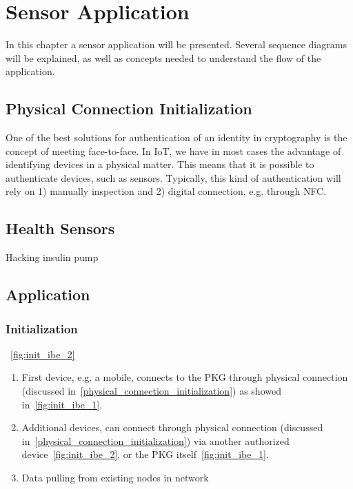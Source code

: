 \chapter{Sensor Application}
In this chapter a sensor application will be presented. 
Several sequence diagrams will be explained, as well as concepts needed to understand the flow of the application. 

\section{Physical Connection Initialization}\label{physical_connection_initialization}
One of the best solutions for authentication of an identity in cryptography is the concept of meeting face-to-face. 
In \gls{IoT}, we have in most cases the advantage of identifying devices in a physical matter. 
This means that it is possible to authenticate devices, such as sensors. 
Typically, this kind of authentication will rely on 1) manually inspection and 2) digital connection, e.g. through \gls{NFC}.

\section{Health Sensors}
Hacking insulin pump~\cite{radcliffe2011hacking}

\section{Application}


\subsection{Initialization}
~\autoref{fig:init_ibe_2}

\begin{enumerate}
  \item First device, e.g. a mobile, connects to the \gls{PKG} through physical connection (discussed in~\autoref{physical_connection_initialization}) as showed in~\autoref{fig:init_ibe_1}.
  \item Additional devices, can connect through physical connection (discussed in~\autoref{physical_connection_initialization}) via another authorized device~\autoref{fig:init_ibe_2}, or the \gls{PKG} itself~\autoref{fig:init_ibe_1}. 
  \item Data pulling from existing nodes in network
\end{enumerate}

